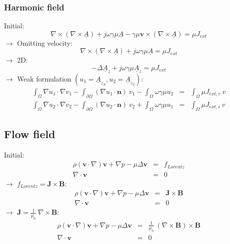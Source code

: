 \documentclass[smallextended]{svjour3}       %
\begin{document}
		\subsubsection{Harmonic field}
		Initial:
		\begin{equation}
			\nabla \times \left(\nabla \times \underline A \right) + j \omega \gamma \mu \underline A - \gamma \mu \mathbf{v} \times \left( \nabla \times \underline A \right) = \mu J_{ext}
		\end{equation}
		 $\rightarrow$ Omitting velocity:
		\begin{equation}
			\nabla \times \left(\nabla \times \underline A \right) + j \omega \gamma \mu \underline A  = \mu J_{ext}
		\end{equation}
		$\rightarrow$ 2D:
		\begin{equation}
			-\Delta \underline A_z + j \omega \gamma \mu \underline A_z  = \mu J_{ext}
		\end{equation}
		$\rightarrow$ Weak formulation $(u_1 = {\underline A_z}_r, u_2 = {\underline A_z}_i)$:
		\begin{eqnarray}
			\int_{\Omega}\nabla u_1 \cdot \nabla v_1 - \int_{\partial \Omega} \left(\nabla u_1 \cdot \mathbf{n}\right)\ v_1 - \int_{\Omega} \omega \gamma \mu u_2 & = & \int_{\Omega} \mu J_{ext, r} \ v\\
			\int_{\Omega}\nabla u_2 \cdot \nabla v_2 - \int_{\partial \Omega} \left(\nabla u_2 \cdot \mathbf{n}\right)\ v_2 + \int_{\Omega} \omega \gamma \mu u_1 & = & \int_{\Omega} \mu J_{ext, i} \ v
		\end{eqnarray}
		
		\subsection{Flow field}
		Initial:
		\begin{eqnarray}
			\rho \left(\mathbf{v} \cdot \nabla\right)\mathbf{v} + \nabla p - \mu \Delta \mathbf{v} & = & f_{Lorentz}\\
			\nabla \cdot \mathbf{v} & = & 0
		\end{eqnarray}
		$\rightarrow$ $f_{Lorentz} = \mathbf{J} \times \mathbf{B}$:
		\begin{eqnarray}
			\rho \left(\mathbf{v} \cdot \nabla\right)\mathbf{v} + \nabla p - \mu \Delta \mathbf{v} & = & \mathbf{J} \times \mathbf{B}\\
			\nabla \cdot \mathbf{v} & = & 0
		\end{eqnarray}
		$\rightarrow$ $\mathbf{J} = \frac{1}{\mu_0} \ \nabla \times \mathbf{B}$:
		\begin{eqnarray}
			\rho \left(\mathbf{v} \cdot \nabla\right)\mathbf{v} + \nabla p - \mu \Delta \mathbf{v} & = & \frac{1}{\mu_0} \ \left(\nabla \times \mathbf{B} \right) \times \mathbf{B}\\
			\nabla \cdot \mathbf{v} & = & 0
		\end{eqnarray}
\end{document}
